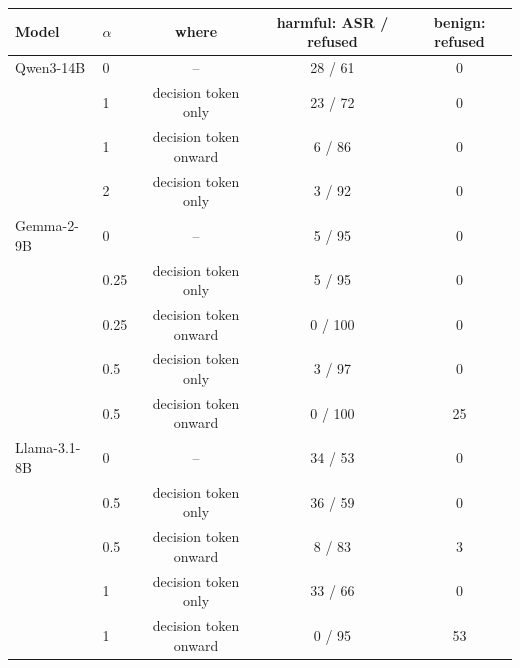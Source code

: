 \begin{tabular}{llccc}
\toprule
Model & $\alpha$ & where & harmful: ASR / refused & benign: refused \\
\midrule
Qwen3-14B & 0 & -- & 28 / 61 & 0 \\
 & 1 & decision token only & 23 / 72 & 0 \\
 & 1 & decision token onward & 6 / 86 & 0 \\
 & 2 & decision token only & 3 / 92 & 0 \\
\midrule
Gemma-2-9B & 0 & -- & 5 / 95 & 0 \\
 & 0.25 & decision token only & 5 / 95 & 0 \\
 & 0.25 & decision token onward & 0 / 100 & 0 \\
 & 0.5 & decision token only & 3 / 97 & 0 \\
 & 0.5 & decision token onward & 0 / 100 & 25 \\
\midrule
Llama-3.1-8B & 0 & -- & 34 / 53 & 0 \\
 & 0.5 & decision token only & 36 / 59 & 0 \\
 & 0.5 & decision token onward & 8 / 83 & 3 \\
 & 1 & decision token only & 33 / 66 & 0 \\
 & 1 & decision token onward & 0 / 95 & 53 \\
\bottomrule
\end{tabular}